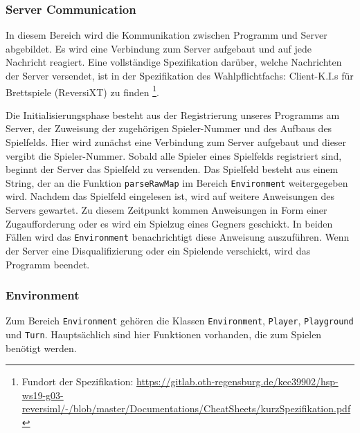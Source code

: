 \documentclass[12pt,a4paper]{article}
\begin{document}
\subsubsection{Server Communication}
In diesem Bereich wird die Kommunikation zwischen Programm und Server abgebildet. Es wird eine Verbindung zum Server aufgebaut und auf jede Nachricht reagiert. Eine vollständige Spezifikation darüber, welche Nachrichten der Server versendet, ist in der Spezifikation des Wahlpflichtfachs: Client-K.I.s für Brettspiele (ReversiXT) zu finden \footnote{Fundort der Spezifikation: \url{https://gitlab.oth-regensburg.de/kec39902/hsp-ws19-g03-reversiml/-/blob/master/Documentations/CheatSheets/kurzSpezifikation.pdf}}. 

Die Initialisierungsphase besteht aus der Registrierung unseres Programms am Server, der Zuweisung der zugehörigen Spieler-Nummer und des Aufbaus des Spielfelds. Hier wird zunächst eine Verbindung zum Server aufgebaut und dieser vergibt die Spieler-Nummer. Sobald alle Spieler eines Spielfelds registriert sind, beginnt der Server das Spielfeld zu versenden. Das Spielfeld besteht aus einem String, der an die Funktion \texttt{parseRawMap} im Bereich \texttt{Environment} weitergegeben wird. Nachdem das Spielfeld eingelesen ist, wird auf weitere Anweisungen des Servers gewartet. Zu diesem Zeitpunkt kommen Anweisungen in Form einer Zugaufforderung oder es wird ein Spielzug eines Gegners geschickt. In beiden Fällen wird das \texttt{Environment} benachrichtigt diese Anweisung auszuführen. Wenn der Server eine Disqualifizierung oder ein Spielende verschickt, wird das Programm beendet.

\subsubsection{Environment}
Zum Bereich \texttt{Environment} gehören die Klassen \texttt{Environment}, \texttt{Player}, \texttt{Playground} und \texttt{Turn}. Hauptsächlich sind hier Funktionen vorhanden, die zum Spielen benötigt werden.
\end{document}
